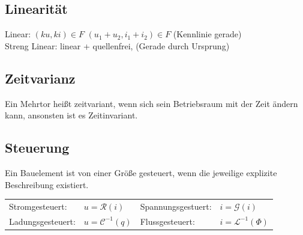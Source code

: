 \documentclass[fs, footer]{latex4ei}
\begin{document}
\begin{multicols*}{4}

    \subsection{Linearität}
    Linear: $(ku, ki) \in F$ \quad $(u_1 + u_2, i_1 + i_2) \in F$ (Kennlinie gerade) \\
    Streng Linear: linear + quellenfrei, (Gerade durch Ursprung)\\

    \subsection{Zeitvarianz}
    Ein Mehrtor heißt zeitvariant, wenn sich sein Betriebsraum mit der Zeit ändern kann, ansonsten
    ist es Zeitinvariant.

    \subsection{Steuerung}
    Ein Bauelement ist von einer Größe gesteuert, wenn die jeweilige explizite Beschreibung existiert.\\
    \begin{tabular*}{\columnwidth}{@{\extracolsep\fill}llll@{}}
        Stromgesteuert: & $u=\mathcal R(i)$ & Spannungsgestuert: & $i=\mathcal G(i)$\\
        Ladungsgesteuert: & $u=\mathcal C^{-1}(q)$ & Flussgesteuert: & $i=\mathcal L^{-1}(\Phi)$
    \end{tabular*}


\end{multicols*}
\end{document}
